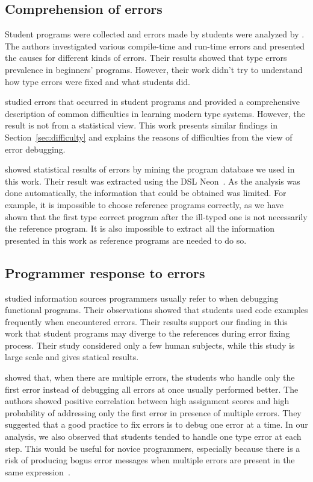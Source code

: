\documentclass[12pt]{report}	%
\begin{document}
\subsection{Comprehension of errors}

Student programs were collected and errors made by students
were analyzed by \cite{tirronen2015understanding}.
The authors investigated various compile-time and run-time errors
and presented the causes for different kinds of errors.
Their results showed that type errors prevalence in beginners' programs.
However, their work didn't try to understand how type
errors were fixed and what students did.

\cite{tirronen2014study} studied
errors that occurred in student programs and
provided a comprehensive description of
common difficulties in learning modern type systems.
However, the result is not from a statistical view.
This work presents similar findings in Section~\ref{sec:difficulty}
and explains the
reasons of difficulties from the view of error debugging.

\cite{hage2006mining} showed statistical
results of errors by mining the program database we used
in this work.
Their result was extracted using the DSL Neon~\cite{Hage09:Neon}.
As the analysis was done automatically, the information that
could be obtained was limited. For example, it is impossible
to choose reference programs correctly, as we have shown that
the first type correct program after the ill-typed one is not
necessarily the reference program. It is also impossible to
extract all the information presented in this work as
reference programs are needed to do so.

\subsection{Programmer response to errors}

\cite{chambers2012function} studied information sources programmers
usually refer to when debugging functional
programs.
Their observations showed that students used
code examples frequently
when encountered errors.
Their results support our finding in this work that
student programs may diverge to the references
during error fixing process. Their study
considered only a few human subjects, while this study is
large scale and gives statical results.

\cite{munson2016analyzing}
showed that, when there are multiple errors,
the students who handle only the first error
instead of debugging all errors at once usually
performed better.
The authors showed positive correlation
between high assignment scores and
high probability of addressing only
the first error in presence of multiple errors.
%
They suggested that a good practice to fix
errors is to debug one error at a time.
In our analysis, we also observed that
students tended to handle one type error at each step.
This would be useful for novice programmers, especially
because there is a risk of producing bogus error messages
when multiple errors are present in
the same expression~\cite{Heeren05:TQT}.
\end{document}
